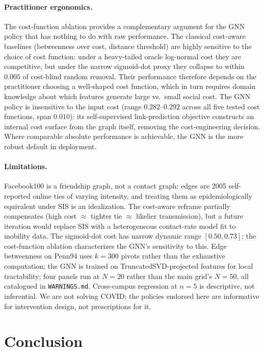 \documentclass{article}
\begin{document}
\paragraph{Practitioner ergonomics.} The cost-function ablation
provides a complementary argument for the GNN policy that has
nothing to do with raw performance. The classical cost-aware
baselines (betweenness over cost, distance threshold) are highly
sensitive to the choice of cost function: under a heavy-tailed
oracle log-normal cost they are competitive, but under the narrow
sigmoid-dot proxy they collapse to within $0.005$ of cost-blind
random removal. Their performance therefore depends on the
practitioner choosing a well-shaped cost function, which in turn
requires domain knowledge about which features generate large vs.\
small social cost. The GNN policy is insensitive to the input
cost (range $0.282$--$0.292$ across all five tested cost functions,
span $0.010$): its self-supervised link-prediction objective
constructs an internal cost surface from the graph itself, removing
the cost-engineering decision. Where comparable absolute
performance is achievable, the GNN is the more robust default in
deployment.

\paragraph{Limitations.} Facebook100 is a friendship graph, not a
contact graph: edges are 2005 self-reported online ties of varying
intensity, and treating them as epidemiologically equivalent under
SIS is an idealization. The cost-aware reframe partially compensates
(high cost $\approx$ tighter tie $\approx$ likelier transmission),
but a future iteration would replace SIS with a heterogeneous
contact-rate model fit to mobility data. The sigmoid-dot cost has
narrow dynamic range $[0.50, 0.73]$; the cost-function ablation
characterizes the GNN's sensitivity to this. Edge betweenness on
Penn94 uses $k = 300$ pivots rather than the exhaustive computation;
the GNN is trained on TruncatedSVD-projected features for local
tractability; four panels run at $N = 20$ rather than the main grid's
$N = 50$, all catalogued in \texttt{WARNINGS.md}. Cross-campus
regression at $n = 5$ is descriptive, not inferential. We are not
solving COVID; the policies endorsed here are informative for
intervention design, not prescriptions for it.

\section{Conclusion}
\label{sec:conclusion}
\end{document}
